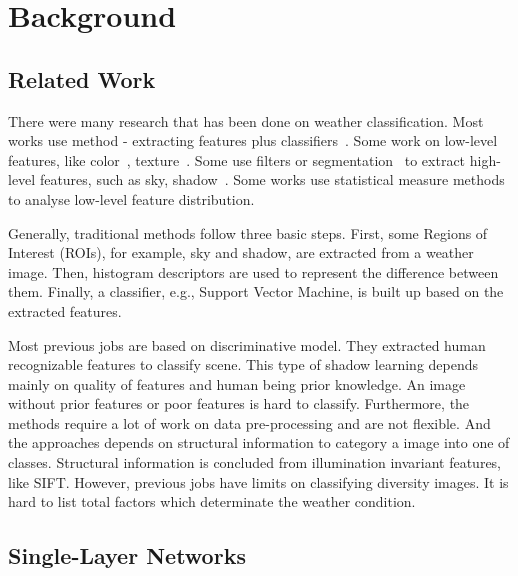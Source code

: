 
\chapter{Background} %
\label{Chapter2}

\section{Related Work}

There were many research that has been done on weather classification. Most works use method - extracting features plus classifiers~\citep{bishop1995neural,roser2008classification,serrano2002computationally,gokalp2007scene}.
Some work on low-level features, like color~\citep{szummer1998indoor}, texture~\citep{shotton2009textonboost,vailaya2002automatic}. Some use filters or segmentation~\citep{boutell2004learning,shotton2009textonboost} to extract high-level features, such as sky, shadow~\citep{lutwo}. Some works use statistical measure methods~\citep{he2014spatial,roser2008classification} to analyse low-level feature distribution.

Generally, traditional methods follow three basic steps\citep{roser2008classification,yan2009weather}. First, some Regions of Interest (ROIs), for example, sky and shadow,  are extracted from a weather image. Then, histogram descriptors are used to represent the difference between them. Finally, a classifier, e.g., Support Vector Machine, is built up based on the extracted features. 

Most previous jobs are based on discriminative model. They extracted human recognizable features to classify scene. This type of shadow learning depends mainly on quality of features and human being prior knowledge. An image without prior features or poor features is hard to classify. Furthermore, the methods require a lot of work on data pre-processing and are not flexible. And the approaches depends on structural information to category a image into one of classes. Structural information is concluded from illumination invariant features, like SIFT. However, previous jobs have limits on classifying diversity images. It is hard to list total factors which determinate the weather condition.

\section{Single-Layer Networks}

